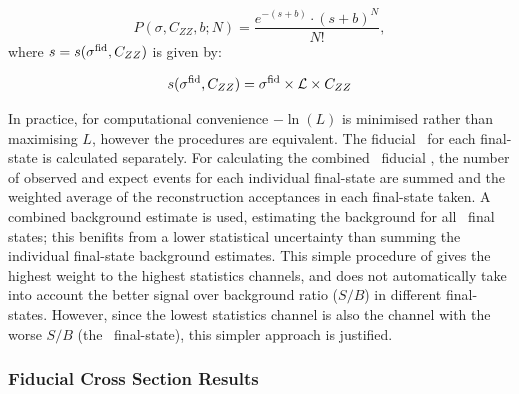 \begin{equation}
P(\sigma, C_{ZZ}, b; N) =
\frac{e^{-(s+b)}\cdot
     \left(s+b\right)^{N}}
     {N!},
\end{equation}
where $s=s(\sigma^{\rm fid}, C_{ZZ})$ is given by:

\begin{equation}
   s(\sigma^{\rm fid}, C_{ZZ}) = \sigma^{\rm fid}\times\mathcal{L}\times C_{ZZ} \\
\end{equation}

In practice, for computational convenience $-\ln(L)$ is minimised rather
than maximising $L$, however the procedures are equivalent. The fiducial
\cx\ for each final-state is calculated separately. For calculating the combined \ZZllll\
fiducial \cx, the number of observed and expect events for each individual
final-state are summed and the weighted average of the reconstruction
acceptances in each final-state taken. A combined background estimate is used,
estimating the background for all \llll\ final states; this benifits from a
lower statistical uncertainty than summing the individual final-state background
estimates. This simple procedure of gives the highest weight to the highest
statistics channels, and does not automatically take into account the better
signal over background ratio ($S/B$) in different final-states. However, since the
lowest statistics channel is also the channel with the worse $S/B$ (the \eeee\
final-state), this simpler approach is justified.

\subsubsection{Fiducial Cross Section Results}

